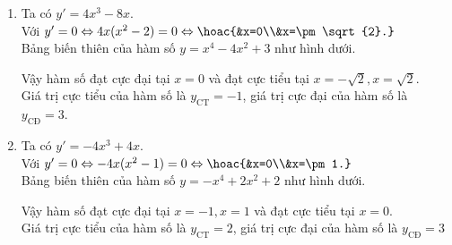 \begin{vd}
{\begin{enumerate}
\begin{center}
            \end{center}
            Vậy hàm số đạt cực đại tại $x=0$ và đạt cực tiểu tại $x=-2$.\\
            Giá trị cực tiểu của hàm số là $y_{\text{CT}}=-3$, giá trị cực đại của hàm số là $y_{\text{CĐ}}=1$.
            \item
            Ta có $y'=4x^3-8x$.\\
            Với $y'=0\Leftrightarrow 4x(x^2-2)=0\Leftrightarrow\hoac{&x=0\\&x=\pm\sqrt{2}.}$\\
            Bảng biến thiên của hàm số $y=x^4-4x^2+3$ như hình dưới.
            \begin{center}
            \end{center}
            Vậy hàm số đạt cực đại tại $x=0$ và đạt cực tiểu tại $x=-\sqrt{2}, x=\sqrt{2}$.\\
            Giá trị cực tiểu của hàm số là $y_{\text{CT}}=-1$, giá trị cực đại của hàm số là $y_{\text{CĐ}}=3$.
            \item
            Ta có $y'=-4x^3+4x$.\\
            Với $y'=0\Leftrightarrow -4x(x^2-1)=0\Leftrightarrow\hoac{&x=0\\&x=\pm1.}$\\
            Bảng biến thiên của hàm số $y=-x^4+2x^2+2$ như hình dưới.
            \begin{center}
            \end{center}
            Vậy hàm số đạt cực đại tại $x=-1, x=1$ và đạt cực tiểu tại $x=0$.\\
            Giá trị cực tiểu của hàm số là $y_{\text{CT}}=2$, giá trị cực đại của hàm số là $y_{\text{CĐ}}=3$
        \end{enumerate}
    }
\end{vd}
